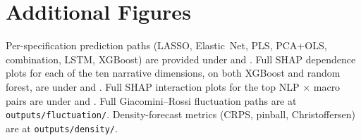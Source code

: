 \documentclass[AER]{AEA}
\begin{document}
\section{Additional Figures}\label{app:figures}

Per-specification prediction paths (LASSO, Elastic~Net, PLS, PCA+OLS,
combination, LSTM, XGBoost) are provided under
 and .
Full SHAP dependence plots for each of the ten narrative dimensions, on
both XGBoost and random forest, are under
 and
.
Full SHAP interaction plots for the top NLP $\times$ macro pairs are
under  and
.
Full Giacomini--Rossi fluctuation paths are at \texttt{outputs/fluctuation/}.
Density-forecast metrics (CRPS, pinball, Christoffersen) are at
\texttt{outputs/density/}.
\end{document}
